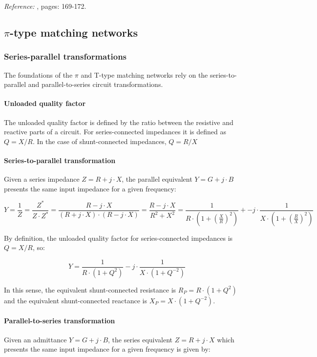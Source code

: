 \noindent \textit{Reference:} \cite{BahlFundamentalsRFMW}, pages: 169-172.

\subsection{$\pi$-type matching networks}
\subsubsection{Series-parallel transformations}
The foundations of the $\pi$ and T-type matching networks rely on the series-to-parallel and parallel-to-series circuit transformations.

\paragraph{Unloaded quality factor}
The unloaded quality factor is defined by the ratio between the resistive and reactive parts of a circuit. For series-connected impedances it is defined as $Q = X/R$. In the case of shunt-connected impedances, $Q = R/X$
\paragraph{Series-to-parallel transformation}
Given a series impedance $Z = R + j \cdot X$, the parallel equivalent $Y = G + j \cdot B$ presents the same input impedance for a given frequency:

\begin{equation}
Y = \frac{1}{Z} = \frac{Z^*}{Z \cdot Z^*} = \frac{R - j \cdot X}{(R + j \cdot X) \cdot (R - j \cdot X)} = \frac{R - j \cdot X}{R^2 + X^2} = \frac{1}{R \cdot \left( 1 + \left( \frac{X}{R} \right)^2\right)} +- j \cdot \frac{1}{X \cdot \left( 1 + \left( \frac{R}{X}\right)^2\right)}
\end{equation}

\noindent By definition, the unloaded quality factor for series-connected impedances is $Q = X/R$, so:

\begin{equation}
Y = \frac{1}{R \cdot (1 + Q^2)} - j \cdot \frac{1}{X \cdot (1 + Q^{-2})}
\end{equation}

\noindent In this sense, the equivalent shunt-connected resistance is $R_P = R \cdot (1 + Q^2)$ and the equivalent shunt-connected reactance is $X_P = X \cdot (1 + Q^{-2})$.

\paragraph{Parallel-to-series transformation}
Given an admittance $Y = G + j \cdot B$, the series equivalent $Z = R + j \cdot X$ which presents the same input impedance for a given frequency is given by:

